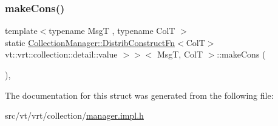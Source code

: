 \subsubsection{\texorpdfstring{make\+Cons()}{makeCons()}}
{\footnotesize\ttfamily template$<$typename MsgT , typename ColT $>$ \\
static \hyperlink{structvt_1_1vrt_1_1collection_1_1_collection_manager_a7503830bc133013d542856fa39834dcc}{Collection\+Manager\+::\+Distrib\+Construct\+Fn}$<$ColT$>$ vt\+::vrt\+::collection\+::detail\+::value $>$$>$$<$ MsgT, ColT $>$\+::make\+Cons (\begin{DoxyParamCaption}\item[{\hyperlink{namespacevt_ab2b3d506ec8e8d1540aede826d84a239}{Msg\+Shared\+Ptr}$<$ MsgT $>$}]{ }\end{DoxyParamCaption})\hspace{0.3cm}{\ttfamily [inline]}, {\ttfamily [static]}}



The documentation for this struct was generated from the following file\+:\begin{DoxyCompactItemize}
\item 
src/vt/vrt/collection/\hyperlink{vrt_2collection_2manager_8impl_8h}{manager.\+impl.\+h}\end{DoxyCompactItemize}
